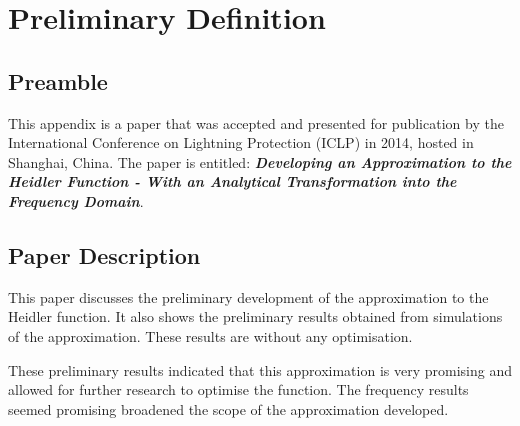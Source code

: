 
\chapter{Preliminary Definition} %

\label{AppendixDef} %



\section{Preamble}
\label{sec:def_preamble}
This appendix is a paper that was accepted and presented for publication by the International Conference on Lightning Protection (ICLP) in 2014, hosted in Shanghai, China. The paper is entitled: \textbf{\textit{Developing an Approximation to the Heidler Function - With an Analytical Transformation into the Frequency Domain}}.


\section{Paper Description}
\label{sec:def_paper_description}
This paper discusses the preliminary development of the approximation to the Heidler function. It also shows the preliminary results obtained from simulations of the approximation. These results are without any optimisation.

These preliminary results indicated that this approximation is very promising and allowed for further research to optimise the function. The frequency results seemed promising broadened the scope of the approximation developed.

\makeatletter

\makeatother
